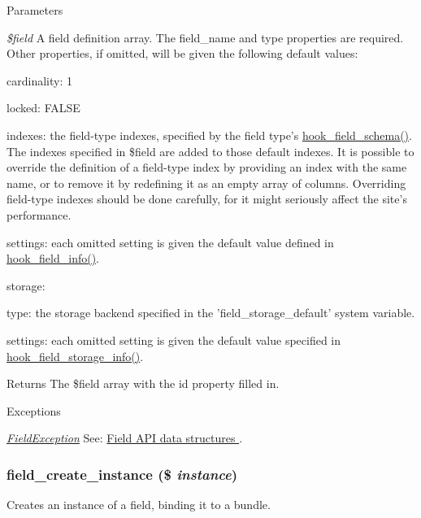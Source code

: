\begin{DoxyParams}{Parameters}
\item[{\em \$field}]A field definition array. The field\_\-name and type properties are required. Other properties, if omitted, will be given the following default values:
\begin{DoxyItemize}
\item cardinality: 1
\item locked: FALSE
\item indexes: the field-\/type indexes, specified by the field type's \hyperlink{group__field__types_gaae7d9348e56f207a8be0b866d25252b7}{hook\_\-field\_\-schema()}. The indexes specified in \$field are added to those default indexes. It is possible to override the definition of a field-\/type index by providing an index with the same name, or to remove it by redefining it as an empty array of columns. Overriding field-\/type indexes should be done carefully, for it might seriously affect the site's performance.
\item settings: each omitted setting is given the default value defined in \hyperlink{group__field__types_gad3eb779f26f41b520f19af011ece3eb1}{hook\_\-field\_\-info()}.
\item storage:
\begin{DoxyItemize}
\item type: the storage backend specified in the 'field\_\-storage\_\-default' system variable.
\item settings: each omitted setting is given the default value specified in \hyperlink{group__field__storage_gadc5bfde3133504e946bb0aae8babe6f3}{hook\_\-field\_\-storage\_\-info()}.
\end{DoxyItemize}
\end{DoxyItemize}\end{DoxyParams}
\begin{DoxyReturn}{Returns}
The \$field array with the id property filled in.
\end{DoxyReturn}

\begin{DoxyExceptions}{Exceptions}
\item[{\em \hyperlink{classFieldException}{FieldException}}]See: \hyperlink{group__field}{Field API data structures }. \end{DoxyExceptions}
\hypertarget{group__field__crud_ga3a1e23613d572a6e908e063c3a0335f8}{
\subsubsection[{field\_\-create\_\-instance}]{\setlength{\rightskip}{0pt plus 5cm}field\_\-create\_\-instance (\$ {\em instance})}}
\label{group__field__crud_ga3a1e23613d572a6e908e063c3a0335f8}
Creates an instance of a field, binding it to a bundle.


